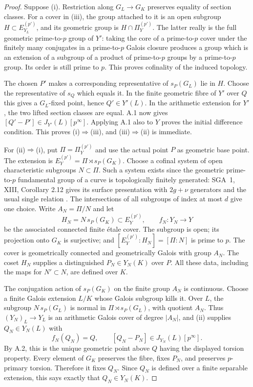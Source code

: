 \begin{proof}
Suppose (i). Restriction along $G_L\to G_K$ preserves equality of
section classes. For a cover in (iii), the group attached to it is
an open subgroup $H\subset E_{Y_L}^{(p')}$, and its geometric group
is $H\cap\Pi_Y^{(p')}$. The latter really is the full geometric
prime-to-$p$ group of $Y'$: taking the core of a prime-to-$p$ cover
under the finitely many conjugates in a prime-to-$p$ Galois closure
produces a group which is an extension of a subgroup of a product
of prime-to-$p$ groups by a prime-to-$p$ group. Its order is still
prime to $p$. This proves cofinality of the induced topology.

The chosen $P'$ makes a corresponding representative of $s_P(G_L)$
lie in $H$. Choose the representative of $s_Q$ which equals it.
In the finite geometric fibre of $Y'$ over $Q$ this gives a
$G_L$-fixed point, hence $Q'\in Y'(L)$. In the arithmetic extension
for $Y'$, the two lifted section classes are equal. A.1 now gives
$[Q'-P']\in J_{Y'}(L)[p^\infty]$. Applying A.1 also to $Y$ proves
the initial difference condition. This proves (i)$\Rightarrow$(iii),
and (iii)$\Rightarrow$(ii) is immediate.

For (ii)$\Rightarrow$(i), put $\Pi=\Pi_Y^{(p')}$ and use the actual
point $P$ as geometric base point. The extension is
$E_Y^{(p')}=\Pi\rtimes s_P(G_K)$. Choose a cofinal system of open
characteristic subgroups $N\subset\Pi$. Such a system exists since
the geometric prime-to-$p$ fundamental group of a curve is
topologically finitely generated: SGA~1, XIII, Corollary 2.12 gives
its surface presentation with $2g+\nu$ generators and the usual
single relation \citep{A_SGA1}. The intersections of all subgroups
of index at most $d$ give one choice. Write $A_N=\Pi/N$ and let
\[
 H_N=N\,s_P(G_K)\subset E_Y^{(p')},\qquad
 f_N:Y_N\longrightarrow Y
\]
be the associated connected finite \'etale cover. The subgroup is
open; its projection onto $G_K$ is surjective; and
$[E_Y^{(p')}:H_N]=[\Pi:N]$ is prime to $p$. The cover is
geometrically connected and geometrically Galois with group $A_N$.
The coset $H_N$ supplies a distinguished $P_N\in Y_N(K)$ over $P$.
All these data, including the maps for $N'\subset N$, are defined
over $K$.

The conjugation action of $s_P(G_K)$ on the finite group $A_N$ is
continuous. Choose a finite Galois extension $L/K$ whose Galois
subgroup kills it. Over $L$, the subgroup
$N\,s_P(G_L)$ is normal in $\Pi\rtimes s_P(G_L)$, with quotient
$A_N$. Thus $(Y_N)_L\to Y_L$ is an arithmetic Galois cover of
degree $|A_N|$, and (ii) supplies $Q_N\in Y_N(L)$ with
\[
 f_N(Q_N)=Q,\qquad [Q_N-P_N]\in J_{Y_N}(L)[p^\infty].
\]
By A.2, this is the unique geometric point above $Q$ having the
displayed torsion property. Every element of $G_K$ preserves the
fibre, fixes $P_N$, and preserves $p$-primary torsion. Therefore it
fixes $Q_N$. Since $Q_N$ is defined over a finite separable extension,
this says exactly that $Q_N\in Y_N(K)$.


\end{proof}

